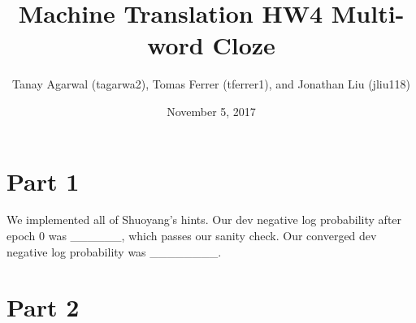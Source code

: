 \documentclass{article}
\title{Machine Translation HW4 Multi-word Cloze}
\author{Tanay Agarwal (tagarwa2), Tomas Ferrer (tferrer1), and Jonathan Liu (jliu118)}
\date{November 5, 2017}
\begin{document}
\section{Part 1}

We implemented all of Shuoyang's hints. Our dev negative log probability after epoch 0 was ______, which passes our sanity check. Our converged dev negative log probability was ________.

\section{Part 2}



\maketitle
\end{document}
